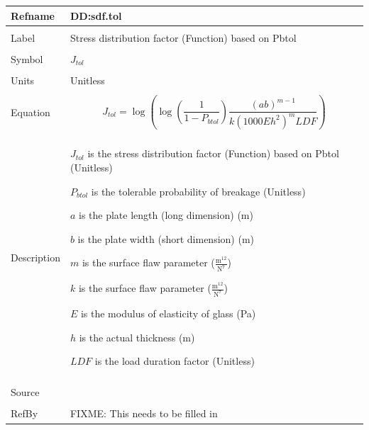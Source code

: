 \documentclass[12pt]{article}
\begin{document}
\noindent \begin{minipage}{\textwidth}
\begin{tabular}{p{} p{}}
\toprule \textbf{Refname} & \textbf{DD:sdf.tol}
\label{DD:sdf.tol}
\\ \midrule \\
Label & Stress distribution factor (Function) based on Pbtol
\\ \midrule \\
Symbol & ${J_{tol}}$
\\ \midrule \\
Units & Unitless
\\ \midrule \\
Equation & \begin{dmath}
           {J_{tol}}=\log\left(\log\left(\frac{1}{1-{P_{btol}}}\right) \frac{\left(a b\right)^{m-1}}{k \left(1000 E h^{2}\right)^{m} LDF}\right)
           \end{dmath}
\\ \midrule \\
Description & \begin{symbDescription}
              \item{${J_{tol}}$ is the stress distribution factor (Function) based on Pbtol (Unitless)}
              \item{${P_{btol}}$ is the tolerable probability of breakage (Unitless)}
              \item{$a$ is the plate length (long dimension) (m)}
              \item{$b$ is the plate width (short dimension) (m)}
              \item{$m$ is the surface flaw parameter ($\frac{\text{m}^{12}}{\text{N}^{7}}$)}
              \item{$k$ is the surface flaw parameter ($\frac{\text{m}^{12}}{\text{N}^{7}}$)}
              \item{$E$ is the modulus of elasticity of glass (Pa)}
              \item{$h$ is the actual thickness (m)}
              \item{$LDF$ is the load duration factor (Unitless)}
              \end{symbDescription}
\\ \midrule \\
Source & 
\\ \midrule \\
RefBy & FIXME: This needs to be filled in
\\ \bottomrule \end{tabular}
\end{minipage}\\
\end{document}
